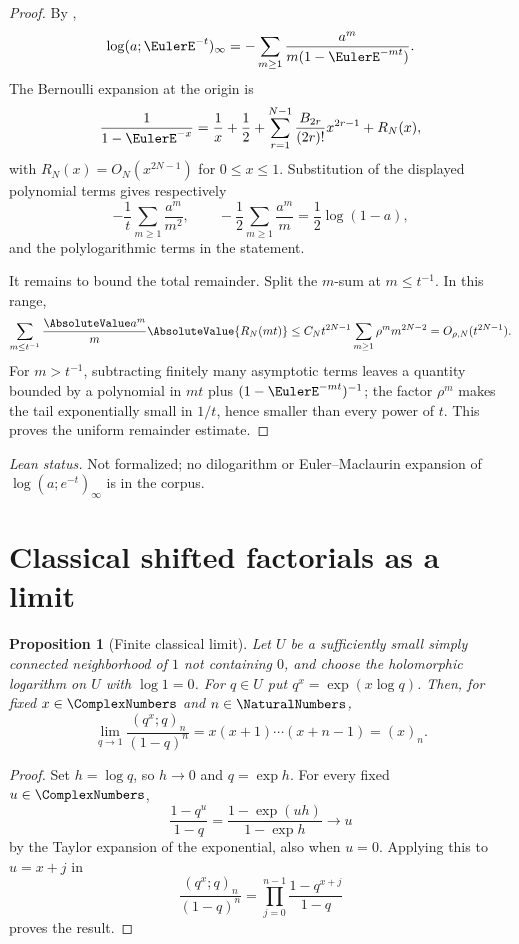 \documentclass[11pt,a4paper,oneside,openany]{book}
\newtheorem{proposition}[proposition]{Proposition}
\theoremstyle{definition}
\theoremstyle{remark}
\begin{document}
\begin{proof}
By ,
\[
 \log(a;\EulerE^{-t})_\infty
 =-\sum_{m\ge1}\frac{a^m}{m(1-\EulerE^{-mt})}.
\]
The Bernoulli expansion at the origin is
\[
 \frac1{1-\EulerE^{-x}}
 =\frac1x+\frac12+\sum_{r=1}^{N-1}
 \frac{B_{2r}}{(2r)!}x^{2r-1}+R_N(x),
\]
with $R_N(x)=O_N(x^{2N-1})$ for $0\le x\le1$.  Substitution of the displayed polynomial terms gives respectively
\[
 -\frac1t\sum_{m\ge1}\frac{a^m}{m^2},
 \qquad
 -\frac12\sum_{m\ge1}\frac{a^m}{m}=\frac12\log(1-a),
\]
and the polylogarithmic terms in the statement.

It remains to bound the total remainder.  Split the $m$-sum at $m\le t^{-1}$.  In this range,
\[
 \sum_{m\le t^{-1}}\frac{\AbsoluteValue a^m}{m}\AbsoluteValue{R_N(mt)}
 \le C_Nt^{2N-1}\sum_{m\ge1}\rho^m m^{2N-2}
 =O_{\rho,N}(t^{2N-1}).
\]
For $m>t^{-1}$, subtracting finitely many asymptotic terms leaves a quantity bounded by a polynomial in $mt$ plus $(1-\EulerE^{-mt})^{-1}$; the factor $\rho^m$ makes the tail exponentially small in $1/t$, hence smaller than every power of $t$.  This proves the uniform remainder estimate.
\end{proof}

\emph{Lean status.}  Not formalized; no dilogarithm or Euler--Maclaurin expansion of
$\log(a;e^{-t})_\infty$ is in the corpus.


\section{Classical shifted factorials as a limit}

\begin{proposition}[Finite classical limit]\label{prop:classical-poch-limit}
Let $U$ be a sufficiently small simply connected neighborhood of $1$ not
containing $0$, and choose the holomorphic logarithm on $U$ with
$\log 1=0$.  For $q\in U$ put $q^x=\exp(x\log q)$.  Then, for fixed
$x\in\ComplexNumbers$ and $n\in\NaturalNumbers$,
\[
 \lim_{q\to1}\frac{(q^x;q)_n}{(1-q)^n}
 =x(x+1)\cdots(x+n-1)=(x)_n.
\]
\end{proposition}

\begin{proof}
Set $h=\log q$, so $h\to0$ and $q=\exp h$.  For every fixed
$u\in\ComplexNumbers$,
\[
 \frac{1-q^u}{1-q}=\frac{1-\exp(uh)}{1-\exp h}\longrightarrow u
\]
by the Taylor expansion of the exponential, also when $u=0$.  Applying this
to $u=x+j$ in
\[
 \frac{(q^x;q)_n}{(1-q)^n}
 =\prod_{j=0}^{n-1}\frac{1-q^{x+j}}{1-q}
\]
proves the result.
\end{proof}
\end{document}
